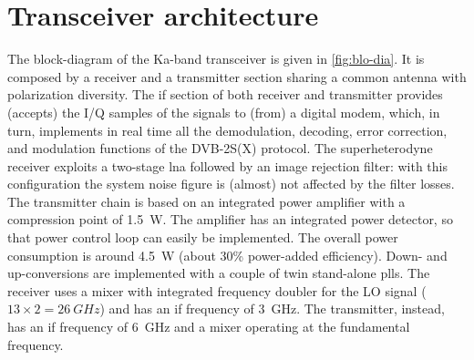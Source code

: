 \documentclass[conference,10pt,a4paper]{IEEEtran}%
\begin{document}
\section{Transceiver architecture}
The block-diagram of the Ka-band transceiver is given in \cref{fig:blo-dia}.
It is composed by a receiver and a transmitter section sharing a common antenna with polarization diversity.
The \ac{if} section of both receiver and transmitter provides (accepts) the I/Q samples of the signals to (from) a digital modem, which, in turn, implements in real time all the demodulation, decoding, error correction, and modulation functions of the DVB-2S(X) protocol.
The superheterodyne receiver exploits a two-stage \ac{lna} followed by an image rejection filter: with this configuration the system noise figure is (almost) not affected by the filter losses.
The transmitter chain is based on an integrated power amplifier with a compression point of \SI{1.5}{\watt}.
The amplifier has an integrated power detector, so that power control loop can easily be implemented.
The overall power consumption is around \SI{4.5}{\watt} (about 30\% power-added efficiency).
Down- and up-conversions are implemented with a couple of twin stand-alone \glspl{pll}.
The receiver uses a mixer with integrated frequency doubler for the LO signal ($13 \times 2=\SI{26}{GHz}$) and has an \ac{if} frequency of \SI{3}{GHz}.
The transmitter, instead, has an \ac{if} frequency of \SI{6}{GHz} and a mixer operating at the fundamental frequency.
\end{document}
